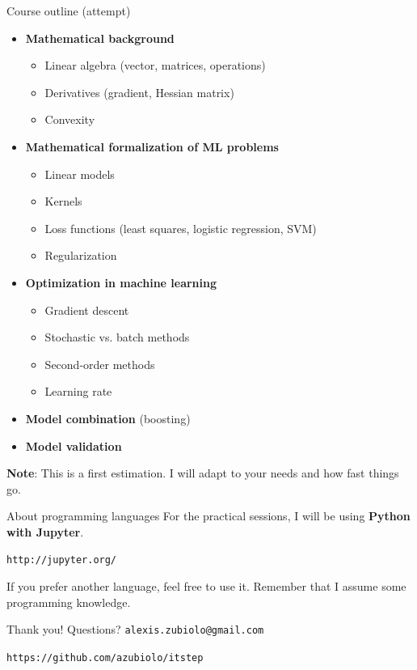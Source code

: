 \documentclass{beamer}
\begin{document}
\begin{frame}{Course outline (attempt)}
\vfill
\begin{itemize}
  \pause
  \item \textbf{Mathematical background}
  \begin{itemize}
  	\item Linear algebra (vector, matrices, operations)
  	\item Derivatives (gradient, Hessian matrix)
  	\item Convexity
  \end{itemize}
  \pause
  \item \textbf{Mathematical formalization of ML problems}
  \begin{itemize}
  	\item Linear models
  	\item Kernels
  	\item Loss functions (least squares, logistic regression, SVM)
  	\item Regularization
  \end{itemize}
  \pause
  \item \textbf{Optimization in machine learning}
  \begin{itemize}
  	\item Gradient descent
  	\item Stochastic vs. batch methods
  	\item Second-order methods
  	\item Learning rate
  \end{itemize}
  \pause
  \item \textbf{Model combination} (boosting)
  \pause
  \item \textbf{Model validation}
\end{itemize}
\vfill
\textbf{Note}: This is a first estimation. I will adapt to your needs and how fast things go.
\end{frame}

\begin{frame}{About programming languages}
For the practical sessions, I will be using \textbf{Python with Jupyter}.
\begin{center}
\texttt{http://jupyter.org/}
\end{center}
\vfill
If you prefer another language, feel free to use it. Remember that I assume some programming knowledge.
\end{frame}

\begin{frame}
\vfill
\centering
\begin{huge}
\huge{Thank you! Questions?}
\vfill
\texttt{alexis.zubiolo@gmail.com}
\end{huge}
\vfill
\begin{Large}
\texttt{https://github.com/azubiolo/itstep}
\end{Large}
\vfill
\end{frame}
\end{document}
